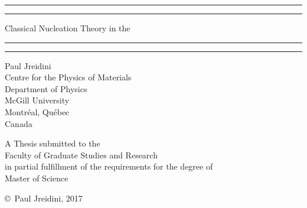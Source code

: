\renewcommand{\baselinestretch}{1.2}\small\normalsize
\vspace*{-0.2in}
\thispagestyle{empty}
\begin{center}
\rule[0pt]{5.6in}{1pt}
\vskip -12pt
\rule[0pt]{5.8in}{3pt}
\vskip 23pt
{\LARGE \sf Classical Nucleation Theory in the
}
\vskip 13pt
\rule[0pt]{5.8in}{3pt}
\vskip -14pt
\rule[0pt]{5.6in}{1pt}
\end{center}
\vspace{-15pt}
\begin{center}
{\large\sf Paul Jreidini}\\
Centre for the Physics of Materials\\
Department of Physics \\
McGill University \\
Montr\'eal, Qu\'ebec \\
Canada \\
\end{center}
\vfill
\vfill
\begin{center}
A Thesis submitted to the\\
Faculty of Graduate Studies and Research \\
in partial fulfillment of the requirements for the degree of\\
Master of Science\\
\end{center}
\vspace{0.0in}
\begin{center}
{\footnotesize \copyright\ Paul Jreidini, 2017}
\end{center}
